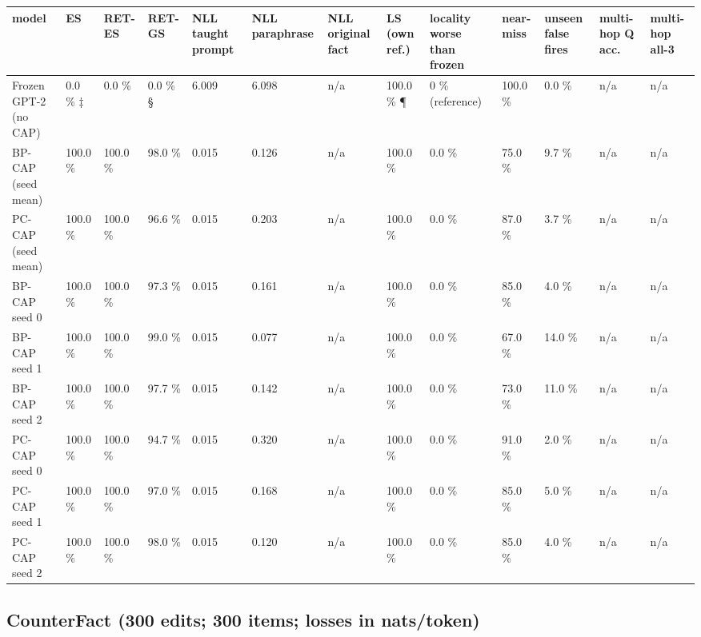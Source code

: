 \documentclass[10pt,a4paper]{article}
\begin{document}
\begin{center}\tiny
\begin{tabularx}{\textwidth}{@{}p{}XXXXXXXXXXXX@{}}
\toprule
model & ES & RET-ES & RET-GS & NLL taught prompt & NLL paraphrase & NLL original fact & LS (own ref.) & locality worse than frozen & near-miss & unseen false fires & multi-hop Q acc. & multi-hop all-3 \\ \midrule
Frozen GPT-2 (no CAP) & 0.0 \% ‡ & 0.0 \% & 0.0 \% § & 6.009 & 6.098 & n/a & 100.0 \% ¶ & 0 \% (reference) & 100.0 \% & 0.0 \% & n/a & n/a \\
BP-CAP (seed mean) & 100.0 \% & 100.0 \% & 98.0 \% & 0.015 & 0.126 & n/a & 100.0 \% & 0.0 \% & 75.0 \% & 9.7 \% & n/a & n/a \\
PC-CAP (seed mean) & 100.0 \% & 100.0 \% & 96.6 \% & 0.015 & 0.203 & n/a & 100.0 \% & 0.0 \% & 87.0 \% & 3.7 \% & n/a & n/a \\
BP-CAP seed 0 & 100.0 \% & 100.0 \% & 97.3 \% & 0.015 & 0.161 & n/a & 100.0 \% & 0.0 \% & 85.0 \% & 4.0 \% & n/a & n/a \\
BP-CAP seed 1 & 100.0 \% & 100.0 \% & 99.0 \% & 0.015 & 0.077 & n/a & 100.0 \% & 0.0 \% & 67.0 \% & 14.0 \% & n/a & n/a \\
BP-CAP seed 2 & 100.0 \% & 100.0 \% & 97.7 \% & 0.015 & 0.142 & n/a & 100.0 \% & 0.0 \% & 73.0 \% & 11.0 \% & n/a & n/a \\
PC-CAP seed 0 & 100.0 \% & 100.0 \% & 94.7 \% & 0.015 & 0.320 & n/a & 100.0 \% & 0.0 \% & 91.0 \% & 2.0 \% & n/a & n/a \\
PC-CAP seed 1 & 100.0 \% & 100.0 \% & 97.0 \% & 0.015 & 0.168 & n/a & 100.0 \% & 0.0 \% & 85.0 \% & 5.0 \% & n/a & n/a \\
PC-CAP seed 2 & 100.0 \% & 100.0 \% & 98.0 \% & 0.015 & 0.120 & n/a & 100.0 \% & 0.0 \% & 85.0 \% & 4.0 \% & n/a & n/a \\
\bottomrule
\end{tabularx}
\end{center}



\subsection*{CounterFact (300 edits; 300 items; losses in nats/token)}
\end{document}
